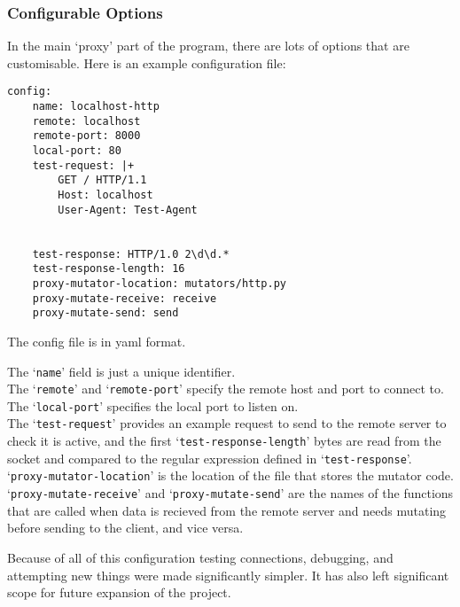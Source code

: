 \subsubsection{Configurable Options}
In the main `proxy' part of the program, there are lots of options that are customisable.
Here is an example configuration file:
\begin{verbatim}
config:
    name: localhost-http
    remote: localhost
    remote-port: 8000
    local-port: 80
    test-request: |+
        GET / HTTP/1.1
        Host: localhost
        User-Agent: Test-Agent


    test-response: HTTP/1.0 2\d\d.*
    test-response-length: 16
    proxy-mutator-location: mutators/http.py
    proxy-mutate-receive: receive
    proxy-mutate-send: send
\end{verbatim}
The config file is in yaml format.\par
The `\texttt{name}' field is just a unique identifier.\\
The `\texttt{remote}' and `\texttt{remote-port}' specify the remote host and port to connect to.\\
The `\texttt{local-port}' specifies the local port to listen on.\\
The `\texttt{test-request}' provides an example request to send to the remote server to check it is active, and the first `\texttt{test-response-length}' bytes are read from the socket and compared to the regular expression defined in `\texttt{test-response}'.\\
`\texttt{proxy-mutator-location}' is the location of the file that stores the mutator code.
`\texttt{proxy-mutate-receive}' and `\texttt{proxy-mutate-send}' are the names of the functions that are called when data is recieved from the remote server and needs mutating before sending to the client, and vice versa.\par
Because of all of this configuration testing connections, debugging, and attempting new things were made significantly simpler. It has also left significant scope for future expansion of the project.

